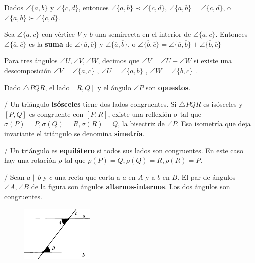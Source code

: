  Dados  $\angle \{\overline{a}, \overline{b} \}$ y  $\angle \{\overline{c}, \overline{d} \}$, entonces  $\angle \{\overline{a}, \overline{b}\} \prec \angle \{\overline{c}, \overline{d} \}$,  $\angle \{\overline{a}, \overline{b}\} = \angle \{\overline{c}, \overline{d} \}$, o  $\angle \{\overline{a}, \overline{b}\} \succ \angle \{\overline{c}, \overline{d} \}$.

 Sea  $\angle \{\overline{a}, \overline{c} \}$ con vértice $V$ y $\overline{b}$ una semirrecta en el interior de $\angle \{\overline{a}, \overline{c} \}$. Entonces $\angle \{\overline{a}, \overline{c} \}$ es la \textbf{suma} de $\angle \{\overline{a}, \overline{c} \}$ y $\angle \{\overline{a}, \overline{b} \}$, o $\angle \{\overline{b}, \overline{c} \}=\angle \{\overline{a}, \overline{b} \}+\angle \{\overline{b}, \overline{c} \}$

 Para tres ángulos $\angle U, \angle V, \angle W$, decimos que $\angle V = \angle U  + \angle W$ si existe una descomposición $\angle V = \angle \{\overline{a}, \overline{c} \}$ ,  $\angle U = \angle \{\overline{a}, \overline{b} \}$ ,  $\angle W = \angle \{\overline{b}, \overline{c} \}$ .

 Dado $\triangle PQR$, el lado $[R, Q]$ y el ángulo $\angle P$ son \textbf{opuestos}.

 /  Un triángulo \textbf{isósceles} tiene dos lados congruentes. Si $\triangle PQR$ es isósceles y $[P,Q]$ es congruente con $[P,R]$, existe una reflexión $\sigma$ tal que $\sigma(P) = P, \sigma(Q) = R, \sigma(R) = Q$, la bisectriz de $\angle P$. Esa isometría que deja invariante el triángulo se denomina \textbf{simetría}.

 /  Un triángulo es \textbf{equilátero} si todos sus lados son congruentes. En este caso hay una rotación $\rho$ tal que $\rho(P) = Q, \rho(Q) = R, \rho(R) = P$.

 /  Sean $a \parallel b$ y $c$ una recta que corta a $a$ en $A$ y a $b$ en $B$. El par de ángulos $\angle A, \angle B$ de la figura son ángulos \textbf{alternos-internos}.
Los dos ángulos son congruentes.
\begin{figure}[H]
	\centering
	\includegraphics[width=3.5cm]{figuras/4-40.png}
	\vspace{-1em}
\end{figure}

